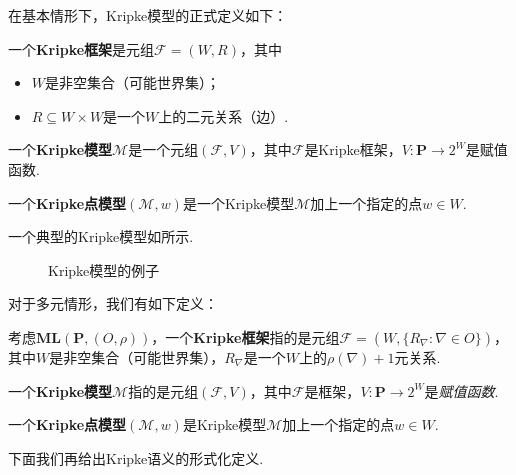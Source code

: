 在基本情形下，Kripke模型的正式定义如下：

\begin{definition}
    一个\textbf{Kripke框架}是元组$\mathcal F=(W,R)$，其中
    \begin{itemize}
        \item $W$是非空集合（可能世界集）；
        \item $R\subseteq W\times W$是一个$W$上的二元关系（边）.
    \end{itemize}

    一个\textbf{Kripke模型}$\mathcal{M}$是一个元组$(\mathcal F,V)$，其中$\mathcal F$是Kripke框架，$V:\mathbf P\to 2^W$是赋值函数.

    一个\textbf{Kripke点模型}$(\mathcal{M},w)$是一个Kripke模型$\mathcal M$加上一个指定的点$w\in W$.
\end{definition}

一个典型的Kripke模型如所示.

\begin{figure}[ht]
    \centering
    
    \caption{Kripke模型的例子}
    \label{fig:Kripke-model-basic}
\end{figure}

对于多元情形，我们有如下定义：

\begin{definition}
    考虑$\mathbf{ML}(\mathbf{P},(O,\rho))$，一个\textbf{Kripke框架}指的是元组$\mathcal F=(W,\{R_\nabla:\nabla\in O\})$，其中$W$是非空集合（可能世界集），$R_\nabla$是一个$W$上的$\rho(\nabla)+1$元关系.

    一个\textbf{Kripke模型}$\mathcal{M}$指的是元组$(\mathcal F,V)$，其中$\mathcal F$是框架，$V:\mathbf P\to 2^W$是\emph{赋值函数}.

    一个\textbf{Kripke点模型}$(\mathcal{M},w)$是Kripke模型$\mathcal M$加上一个指定的点$w\in W$.
\end{definition}


下面我们再给出Kripke语义的形式化定义.


